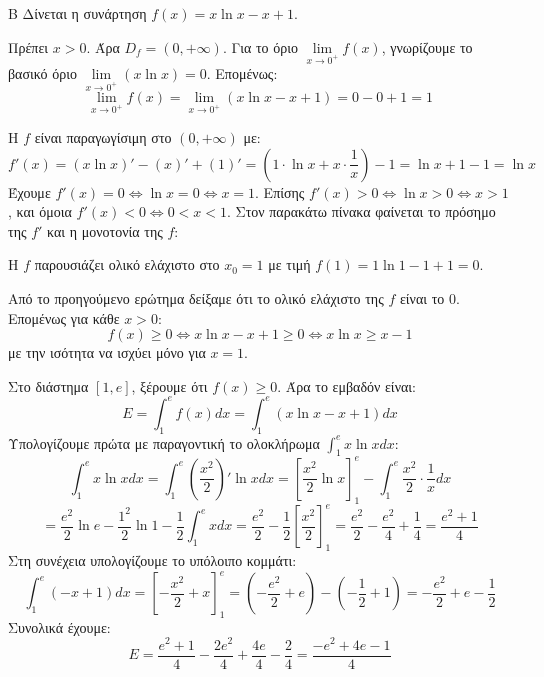 \begin{thema}{Β}
Δίνεται η συνάρτηση $f(x) = x \ln x - x + 1$.

\begin{erwthma}
\item Πρέπει $x > 0$. Άρα $D_f = (0, +\infty)$.
Για το όριο $\lim\limits_{x \to 0^+} f(x)$, γνωρίζουμε το βασικό όριο $\lim\limits_{x \to 0^+} (x \ln x) = 0$. Επομένως:
\[ \lim_{x\to0^+} f(x) = \lim_{x\to0^+} (x \ln x - x + 1) = 0 - 0 + 1 = 1 \]

\item Η $f$ είναι παραγωγίσιμη στο $(0, +\infty)$ με:
\[ f'(x) = (x\ln x)' - (x)' + (1)' = \left( 1 \cdot \ln x + x \cdot \frac{1}{x} \right) - 1 = \ln x + 1 - 1 = \ln x \]
Έχουμε $f'(x) = 0 \Leftrightarrow \ln x = 0 \Leftrightarrow x = 1$.
Επίσης $f'(x) > 0 \Leftrightarrow \ln x > 0 \Leftrightarrow x > 1$, και όμοια $f'(x) < 0 \Leftrightarrow 0 < x < 1$.
Στον παρακάτω πίνακα φαίνεται το πρόσημο της $f'$ και η μονοτονία της $f$:
\begin{center}
\end{center}
Η $f$ παρουσιάζει ολικό ελάχιστο στο $x_0 = 1$ με τιμή $f(1) = 1\ln 1 - 1 + 1 = 0$.

\item Από το προηγούμενο ερώτημα δείξαμε ότι το ολικό ελάχιστο της $f$ είναι το $0$. Επομένως για κάθε $x > 0$:
\[ f(x) \ge 0 \Leftrightarrow x \ln x - x + 1 \ge 0 \Leftrightarrow x \ln x \ge x - 1 \]
με την ισότητα να ισχύει μόνο για $x = 1$.

\item Στο διάστημα $[1, e]$, ξέρουμε ότι $f(x) \ge 0$. Άρα το εμβαδόν είναι:
\[ E = \int_1^e f(x) dx = \int_1^e (x \ln x - x + 1) dx \]
Υπολογίζουμε πρώτα με παραγοντική το ολοκλήρωμα $\int_1^e x \ln x dx$:
\[ \int_1^e x \ln x dx = \int_1^e \left(\frac{x^2}{2}\right)' \ln x dx = \left[ \frac{x^2}{2} \ln x \right]_1^e - \int_1^e \frac{x^2}{2} \cdot \frac{1}{x} dx \]
\[ = \frac{e^2}{2} \ln e - \frac{1^2}{2} \ln 1 - \frac{1}{2}\int_1^e x dx = \frac{e^2}{2} - \frac{1}{2} \left[ \frac{x^2}{2} \right]_1^e = \frac{e^2}{2} - \frac{e^2}{4} + \frac{1}{4} = \frac{e^2+1}{4} \]
Στη συνέχεια υπολογίζουμε το υπόλοιπο κομμάτι:
\[ \int_1^e (-x+1) dx = \left[ -\frac{x^2}{2} + x \right]_1^e = \left(-\frac{e^2}{2} + e\right) - \left(-\frac{1}{2} + 1\right) = -\frac{e^2}{2} + e - \frac{1}{2} \]
Συνολικά έχουμε:
\[ E = \frac{e^2+1}{4} - \frac{2e^2}{4} + \frac{4e}{4} - \frac{2}{4} = \frac{-e^2 + 4e - 1}{4} \]
\end{erwthma}
\end{thema}

